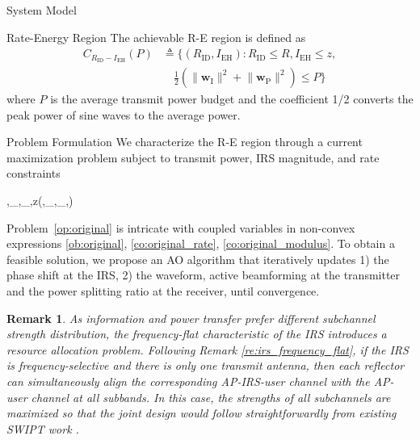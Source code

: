 \documentclass[journal]{IEEEtran}
\newtheorem{remark}{Remark}
\begin{document}
\begin{section}{System Model}
		\begin{subsection}{Rate-Energy Region}
			The achievable R-E region is defined as
			\begin{align}
				C_{R_{\text{ID}}-I_{\text{EH}}}(P)
				&\triangleq \biggl\{(R_{\text{ID}}, I_{\text{EH}}): R_{\text{ID}} \le R, I_{\text{EH}} \le z,\nonumber\\
				&\quad \frac{1}{2}\left(\lVert{\boldsymbol{w}_{\text{I}}}\rVert^2+\lVert{\boldsymbol{w}_\text{P}}\rVert^2\right) \le P\biggr\}
			\end{align}
			where $P$ is the average transmit power budget and the coefficient \num{1/2} converts the peak power of sine waves to the average power.
		\end{subsection}
	\end{section}


	\begin{section}{Problem Formulation}\label{se:problem_formulation}
		We characterize the R-E region through a current maximization problem subject to transmit power, IRS magnitude, and rate constraints
		\begin{maxi!}
			{\boldsymbol{\phi},_{},_,\rho}{z(\boldsymbol{\phi},_{},_,\rho)}{\label{op:original}}{\label{ob:original}}
			\label{co:original_power}
			\label{co:original_rate}
			\label{co:original_modulus}
		\end{maxi!}
		Problem~\eqref{op:original} is intricate with coupled variables in non-convex expressions \eqref{ob:original}, \eqref{co:original_rate}, \eqref{co:original_modulus}. To obtain a feasible solution, we propose an AO algorithm that iteratively updates 1) the phase shift at the IRS, 2) the waveform, active beamforming at the transmitter and the power splitting ratio at the receiver, until convergence.
		\begin{remark}\label{re:irs_subchannel_alignment}
			As information and power transfer prefer different subchannel strength distribution, the frequency-flat characteristic of the IRS introduces a resource allocation problem. Following Remark \ref{re:irs_frequency_flat}, if the IRS is frequency-selective and there is only one transmit antenna, then each reflector can simultaneously align the corresponding AP-IRS-user channel with the AP-user channel at all subbands. In this case, the strengths of all subchannels are maximized so that the joint design would follow straightforwardly from existing SWIPT work \cite{Clerckx2018b}.
		\end{remark}



\end{section}
\end{document}
